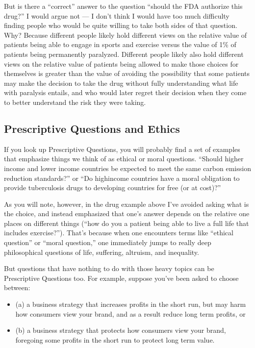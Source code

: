 \documentclass[letterpaper,10pt,english]{jupyterBook}
\begin{document}
\sphinxAtStartPar
But is there a “correct” answer to the question “should the FDA authorize this drug?” I would argue not — I don’t think I would have too much difficulty finding people who would be quite willing to take both sides of that question. Why? Because different people likely hold different views on the relative value of patients being able to engage in sports and exercise versus the value of 1\% of patients being permanently paralyzed. Different people likely also hold different views on the relative value of patients being allowed to make those choices for themselves is greater than the value of avoiding the possibility that some patients may make the decision to take the drug without fully understanding what life with paralysis entails, and who would later regret their decision when they come to better understand the risk they were taking.


\subsection{Prescriptive Questions and Ethics}
\label{\detokenize{30_questions/05_descriptive_v_prescriptive:prescriptive-questions-and-ethics}}
\sphinxAtStartPar
If you look up Prescriptive Questions, you will probably find a set of examples that emphasize things we think of as ethical or moral questions. “Should higher income and lower income countries be expected to meet the same carbon emission reduction standards?” or “Do high\sphinxhyphen{}income countries have a moral obligation to provide tuberculosis drugs to developing countries for free (or at cost)?”

\sphinxAtStartPar
As you will note, however, in the drug example above I’ve avoided asking what is the  choice, and instead emphasized that one’s answer depends on the relative  one places on different things (“how do you  a patient being able to live a full life that includes exercise?”). That’s because when one encounters terms like “ethical question” or “moral question,” one immediately jumps to really deep philosophical questions of life, suffering, altruism, and inequality.

\sphinxAtStartPar
But questions that have nothing to do with those heavy topics can be Prescriptive Questions too. For example, suppose you’ve been asked to choose between:
\begin{itemize}
\item {} 
\sphinxAtStartPar
(a) a business strategy that increases profits in the short run, but may harm how consumers view your brand, and as a result reduce long term profits, or

\item {} 
\sphinxAtStartPar
(b) a business strategy that protects how consumers view your brand, foregoing some profits in the short run to protect long term value.

\end{itemize}
\end{document}
